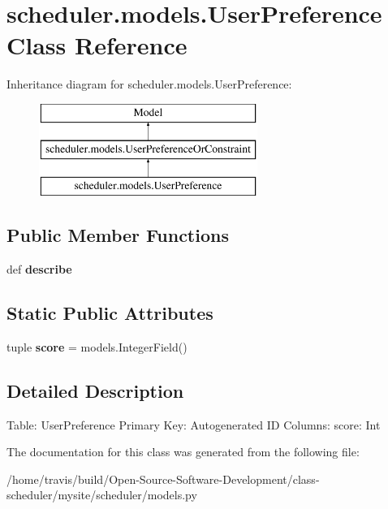 \hypertarget{classscheduler_1_1models_1_1_user_preference}{\section{scheduler.\-models.\-User\-Preference Class Reference}
\label{classscheduler_1_1models_1_1_user_preference}
}
Inheritance diagram for scheduler.\-models.\-User\-Preference\-:\begin{figure}[H]
\begin{center}
\leavevmode
\includegraphics[height=3.000000cm]{classscheduler_1_1models_1_1_user_preference}
\end{center}
\end{figure}
\subsection*{Public Member Functions}
\begin{DoxyCompactItemize}
\item 
\hypertarget{classscheduler_1_1models_1_1_user_preference_a9f811ec38d568d99837e79b2b0699da6}{def {\bfseries describe}}\label{classscheduler_1_1models_1_1_user_preference_a9f811ec38d568d99837e79b2b0699da6}

\end{DoxyCompactItemize}
\subsection*{Static Public Attributes}
\begin{DoxyCompactItemize}
\item 
\hypertarget{classscheduler_1_1models_1_1_user_preference_aefe583851d963dac6a85e6f8badfbffa}{tuple {\bfseries score} = models.\-Integer\-Field()}\label{classscheduler_1_1models_1_1_user_preference_aefe583851d963dac6a85e6f8badfbffa}

\end{DoxyCompactItemize}


\subsection{Detailed Description}
\begin{DoxyVerb}    Table: UserPreference
    Primary Key: Autogenerated ID
    Columns:
        score: Int
\end{DoxyVerb}
 

The documentation for this class was generated from the following file\-:\begin{DoxyCompactItemize}
\item 
/home/travis/build/\-Open-\/\-Source-\/\-Software-\/\-Development/class-\/scheduler/mysite/scheduler/models.\-py\end{DoxyCompactItemize}
